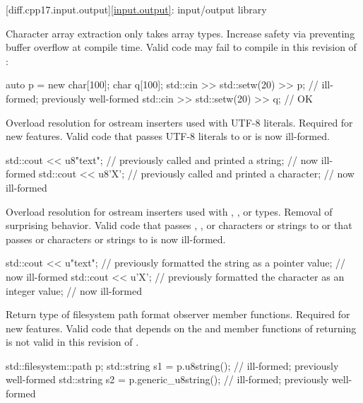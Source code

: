 [diff.cpp17.input.output]{\ref{input.output}: input/output library}

\change
Character array extraction only takes array types.
\rationale
Increase safety via preventing buffer overflow at compile time.
\effect
Valid \CppXVII{} code may fail to compile in this revision of \Cpp{}:
\begin{codeblock}
auto p = new char[100];
char q[100];
std::cin >> std::setw(20) >> p;         // ill-formed; previously well-formed
std::cin >> std::setw(20) >> q;         // OK
\end{codeblock}

\change
Overload resolution for ostream inserters used with UTF-8 literals.
\rationale
Required for new features.
\effect
Valid \CppXVII{} code that passes UTF-8 literals to
 or
 is now ill-formed.
\begin{codeblock}
std::cout << u8"text";          // previously called  and printed a string;
                                // now ill-formed
std::cout << u8'X';             // previously called  and printed a character;
                                // now ill-formed
\end{codeblock}

\change
Overload resolution for ostream inserters
used with , , or  types.
\rationale
Removal of surprising behavior.
\effect
Valid \CppXVII{} code that passes
, , or  characters or strings
to  or
that passes  or  characters or strings
to  is now ill-formed.
\begin{codeblock}
std::cout << u"text";           // previously formatted the string as a pointer value;
                                // now ill-formed
std::cout << u'X';              // previously formatted the character as an integer value;
                                // now ill-formed
\end{codeblock}

\change
Return type of filesystem path format observer member functions.
\rationale
Required for new features.
\effect
Valid \CppXVII{} code that depends on the  and
 member functions of 
returning  is not valid in this revision of \Cpp{}.
\begin{codeblock}
std::filesystem::path p;
std::string s1 = p.u8string();          // ill-formed; previously well-formed
std::string s2 = p.generic_u8string();  // ill-formed; previously well-formed
\end{codeblock}

